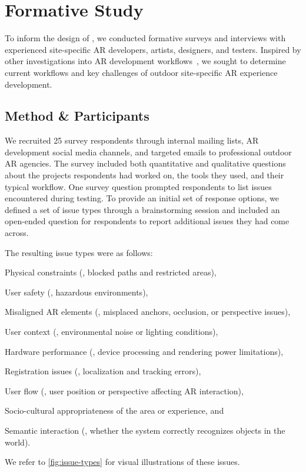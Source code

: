 \section{Formative Study}\label{sec:formative-study}
To inform the design of \SystemName, we conducted formative surveys and interviews with experienced site-specific AR developers, artists, designers, and testers. Inspired by other investigations into AR development workflows~\cite{speicherXDARChallengesOpportunities2018,ashtariCreatingAugmentedVirtual2020,kraussCurrentPracticesChallenges2021}, we sought to determine current workflows and key challenges of outdoor site-specific AR experience development.

\subsection{Method \& Participants}\label{sec:formative-method-participants}
We recruited 25 survey respondents through internal mailing lists, AR development social media channels, and targeted emails to professional outdoor AR agencies. The survey included both quantitative and qualitative questions about the projects respondents had worked on, the tools they used, and their typical workflow. One survey question prompted respondents to list issues encountered during \insitu testing. To provide an initial set of response options, we defined a set of issue types through a brainstorming session and included an open-ended question for respondents to report additional issues they had come across.

The resulting issue types were as follows:
\begin{enumerate*}[label=(\Alph*)]
    \item Physical constraints (\eg, blocked paths and restricted areas),
    \item User safety (\eg, hazardous environments),
    \item Misaligned AR elements (\eg, misplaced anchors, occlusion, or perspective issues),
    \item User context (\eg, environmental noise or lighting conditions),
    \item Hardware performance (\eg, device processing and rendering power limitations),
    \item Registration issues (\eg, localization and tracking errors),
    \item User flow (\eg, user position or perspective affecting AR interaction),
    \item Socio-cultural appropriateness of the area or experience, and
    \item Semantic interaction (\eg, whether the system correctly recognizes objects in the world).
\end{enumerate*}
We refer to \cref{fig:issue-types} for visual illustrations of these issues.

